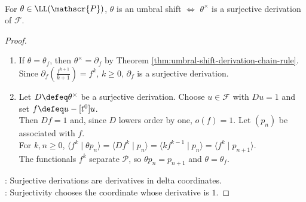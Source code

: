 \begin{theorem} \label{thm:umbral-shifts-and-derivations} \\
For $\theta\in\LL(\mathscr{P})$, $\theta$ is an umbral shift $\Longleftrightarrow$ $\theta^\times$ is a surjective derivation of $\mathscr{F}$.
\begin{proof}
\begin{enumerate}[label=\roman*.]
\setlength{\itemsep}{0pt}
\item[$(\Rightarrow)$] If $\theta=\theta_f$, then $\theta^\times=\partial_f$ by Theorem \ref{thm:umbral-shift-derivation-chain-rule}. Since $\partial_f\left(\frac{f^{k+1}}{k+1}\right)=f^k$, $k\geq0$, $\partial_f$ is a surjective derivation.
\item[$(\Leftarrow)$] Let $D\defeq\theta^\times$ be a surjective derivation. Choose $u\in\mathscr{F}$ with $Du=1$ and set $f\defeq u-[t^0]u$.\\
Then $Df=1$ and, since $D$ lowers order by one, $o(f)=1$. Let $(p_n)$ be associated with $f$.\\
For $k,n\geq0$, $\langle f^k\mid \theta p_n\rangle =\langle Df^k\mid p_n\rangle =\langle kf^{k-1}\mid p_n\rangle =\langle f^k\mid p_{n+1}\rangle$.\\
The functionals $f^k$ separate $\mathscr{P}$, so $\theta p_n=p_{n+1}$ and $\theta=\theta_f$.
\end{enumerate}
: Surjective derivations are derivatives in delta coordinates.\\
: Surjectivity chooses the coordinate whose derivative is $1$.
\end{proof}
\end{theorem}
